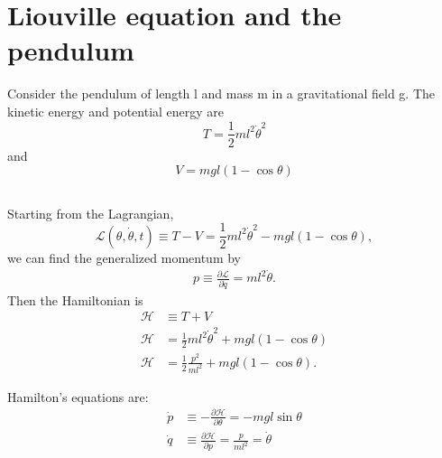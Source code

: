 \section{Liouville equation and the pendulum}

Consider the pendulum of length l and mass m in a gravitational field
g. The kinetic energy and potential energy are
\begin{equation}
    T=\frac{1}{2}ml^2\dot{\theta}^2
\end{equation}
and 
\begin{equation}
    V=mgl(1-\cos\theta)
\end{equation}

\subsection{}
Starting from the Lagrangian, 
\begin{equation*}
    \mathcal{L}(\theta,\dot{\theta},t)\equiv T-V = \frac{1}{2}ml^2\dot{\theta}^2 - mgl(1 - \cos\theta),
\end{equation*}
we can find the generalized momentum by
\begin{align*}
    p\equiv\frac{\partial\mathcal{L}}{\partial\dot{q}}=ml^2\dot{\theta}.
\end{align*}
Then the Hamiltonian is
\begin{align*}
    \mathcal{H}&\equiv T+V\\
    \mathcal{H}&=\frac{1}{2}ml^2\dot{\theta}^2+mgl(1-\cos\theta)\\
    \mathcal{H}&=\frac{1}{2}\frac{p^2}{ml^2}+mgl(1-\cos\theta).
\end{align*}

Hamilton's equations are:
\begin{align*}
    \dot{p}&\equiv-\frac{\partial\mathcal{H}}{\partial\theta}=-mgl\sin\theta\\
    \dot{q}&\equiv\frac{\partial\mathcal{H}}{\partial p}=\frac{p}{ml^2}=\dot{\theta}
\end{align*}

